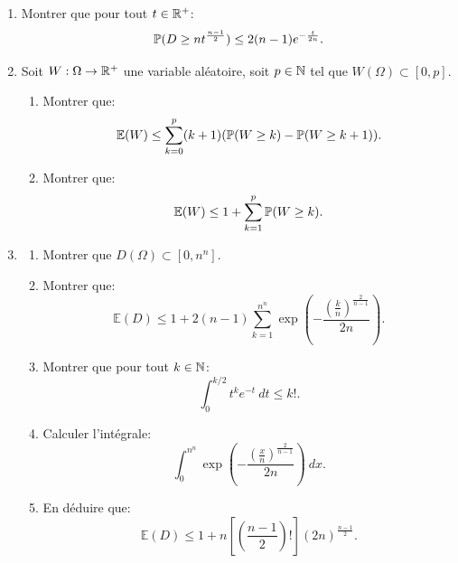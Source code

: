 \begin{enumerate}
 
 \item Montrer que pour tout $t\in \mathbb{R}^{+}$:
 \[ \mathbb{P}(D\geq nt^{\frac{n-1}{2}}) \leq 2(n-1)e^{-\frac{t}{2n}}.\]
 
 \item Soit $W:\Omega \to \mathbb{R}^{+}$ une variable aléatoire, soit $p\in \mathbb{N}$ tel que $W(\Omega) \subset [ 0, p]$.
 \begin{enumerate}
  \item Montrer que:
  \[ \mathbb{E}(W) \leq \sum_{k=0}^{p}(k+1)(\mathbb{P}(W\geq k) - \mathbb{P}(W\geq k+1)).\]
  \item Montrer que:
  \[ \mathbb{E}(W) \leq 1 + \sum_{k=1}^{p}\mathbb{P}(W\geq k).\]
 \end{enumerate}
 
 
 \item \begin{enumerate}
            \item Montrer que $D(\Omega) \subset [ 0, n^{n}]$.
            \item Montrer que:
            \[ \mathbb{E}(D) \leq 1 + 2(n-1)\sum_{k=1}^{n^{n}}\exp\left ( -\frac{{\left (\frac{k}{n}\right )^{\frac{2}{n-1}}}}{2n}\right ).\]
            \item Montrer que pour tout $k\in \mathbb{N}$:
            \[ \int_{0}^{k/2}t^{k}e^{-t}\ dt \leq k!.\]
            \item Calculer l'intégrale:
            \[ \int_{0}^{n^{n}}\exp\left ( -\frac{{\left (\frac{x}{n}\right )^{\frac{2}{n-1}}}}{2n}\right )\ dx.\]
            \item En déduire que:
            \[ \mathbb{E}(D) \leq 1 + n\left [\left ( \frac{n-1}{2}\right )!\right ] (2n)^{\frac{n-1}{2}}.\]
           \end{enumerate}


 


 
\end{enumerate}

